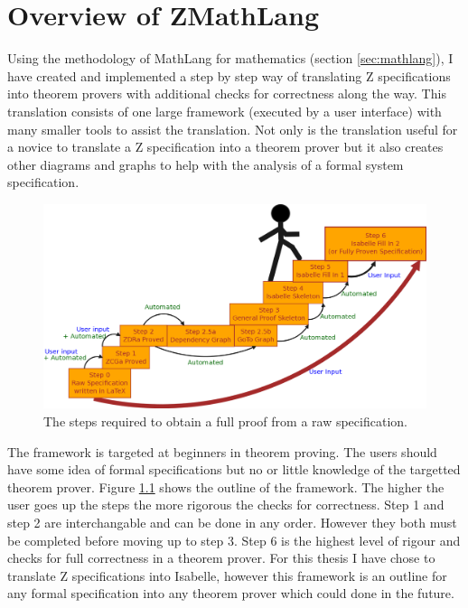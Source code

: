 
\chapter{Overview of ZMathLang}
\label{ch:design}

Using the methodology of MathLang for mathematics (section \ref{sec:mathlang}), I have created and implemented a step by step way of translating Z specifications into theorem provers with additional checks for correctness along the way. This translation consists of one large framework (executed by a user interface) with many smaller tools to assist the translation. Not only is the translation useful for a novice to translate a Z specification into a theorem prover but it also creates other diagrams and graphs to help with the analysis of a formal system specification.

\begin{figure}[H]
 \begin{center}
 \includegraphics [width=12cm]{Figures/Design/mathlangsteps.png}
 \caption{The steps required to obtain a full proof from a raw specification.}
 \label{fig:steps}
\end{center}
\end{figure} 

The framework is targeted at beginners in theorem proving. The users should have some idea of formal specifications but no or little knowledge of the targetted theorem prover. Figure \ref{fig:steps} shows the outline of the framework. The higher the user goes up the steps the more rigorous the checks for correctness. Step 1 and step 2 are interchangable and can be done in any order. However they both must be completed before moving up to step 3. Step 6 is the highest level of rigour and checks for full correctness in a theorem prover. For this thesis I have chose to translate Z specifications into Isabelle, however this framework is an outline for any formal specification into any theorem prover which could done in the future.

